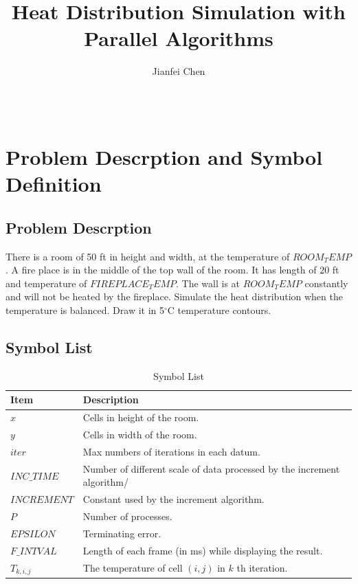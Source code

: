 \documentclass{acm_proc_article-sp}
\begin{document}
\title{Heat Distribution Simulation with Parallel Algorithms}


\author{
\alignauthor
Jianfei Chen\\
       \\
       \\
}

\maketitle
\section{Problem Descrption and Symbol Definition}
\subsection{Problem Descrption}

There is a room of 50 ft in height and width, at the temperature of $ROOM_TEMP$. A fire place is in the middle of the top wall of the room. It has length of 20 ft and temperature of $FIREPLACE_TEMP$. The wall is at $ROOM_TEMP$ constantly and will not be heated by the fireplace. Simulate the heat distribution when the temperature is balanced. Draw it in 5$^\circ$C temperature contours.

\subsection{Symbol List}

\begin{table}[htbp]
  \centering\caption{\label{symbols}Symbol List}
  \begin{tabular}{|p{3cm}|p{5cm}|}
  \toprule
		Item & Description\\
  \midrule
		$x$ 			& Cells in height of the room. \\
		$y$ 			& Cells in width of the room. \\
		$iter$  & Max numbers of iterations in each datum. \\
		$INC\_TIME$ & Number of different scale of data processed by the increment algorithm/\\
		$INCREMENT$      & Constant used by the increment algorithm. \\
		$P$				& Number of processes. \\
		$EPSILON$		& Terminating error.\\
		$F\_INTVAL$ & Length of each frame (in ms) while displaying the result.\\
		$T_{k,i,j}$      & The temperature of cell $(i, j)$ in $k$ th iteration. \\
  \bottomrule
  \end{tabular}
\end{table}
\end{document}
